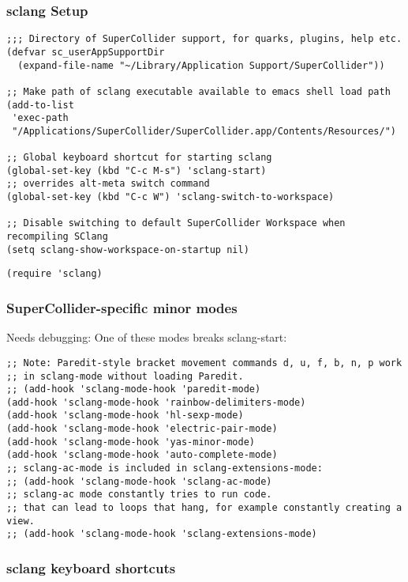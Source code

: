 \documentclass{article}
\begin{document}
\subsubsection{sclang Setup}
\label{sec-2-2-1}
\begin{verbatim}
;;; Directory of SuperCollider support, for quarks, plugins, help etc.
(defvar sc_userAppSupportDir
  (expand-file-name "~/Library/Application Support/SuperCollider"))

;; Make path of sclang executable available to emacs shell load path
(add-to-list
 'exec-path
 "/Applications/SuperCollider/SuperCollider.app/Contents/Resources/")

;; Global keyboard shortcut for starting sclang
(global-set-key (kbd "C-c M-s") 'sclang-start)
;; overrides alt-meta switch command
(global-set-key (kbd "C-c W") 'sclang-switch-to-workspace)

;; Disable switching to default SuperCollider Workspace when recompiling SClang
(setq sclang-show-workspace-on-startup nil)
\end{verbatim}

\begin{verbatim}
(require 'sclang)
\end{verbatim}

\subsubsection{SuperCollider-specific minor modes}
\label{sec-2-2-2}

Needs debugging: One of these modes breaks sclang-start:

\begin{verbatim}
;; Note: Paredit-style bracket movement commands d, u, f, b, n, p work
;; in sclang-mode without loading Paredit.
;; (add-hook 'sclang-mode-hook 'paredit-mode)
(add-hook 'sclang-mode-hook 'rainbow-delimiters-mode)
(add-hook 'sclang-mode-hook 'hl-sexp-mode)
(add-hook 'sclang-mode-hook 'electric-pair-mode)
(add-hook 'sclang-mode-hook 'yas-minor-mode)
(add-hook 'sclang-mode-hook 'auto-complete-mode)
;; sclang-ac-mode is included in sclang-extensions-mode:
;; (add-hook 'sclang-mode-hook 'sclang-ac-mode)
;; sclang-ac mode constantly tries to run code.
;; that can lead to loops that hang, for example constantly creating a view.
;; (add-hook 'sclang-mode-hook 'sclang-extensions-mode)
\end{verbatim}

\subsubsection{sclang keyboard shortcuts}
\label{sec-2-2-3}
\end{document}
